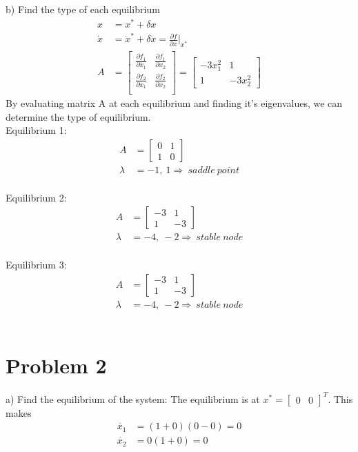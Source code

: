 \documentclass[paper=a4, fontsize=11pt]{scrartcl} %
\numberwithin{equation}{section} %
\numberwithin{figure}{section} %
\numberwithin{table}{section} %
\begin{document}
b) Find the type of each equilibrium
\begin{align*}
x &= x^* + \delta x \\
\dot{x} &= \dot{x}^* + \delta \dot{x} = \frac{\partial f}{\partial x}\Bigr|_{x^*} \\
A &= \begin{bmatrix}
\frac{\partial f_1}{\partial x_1} & \frac{\partial f_1}{\partial x_2} \\ 
\frac{\partial f_2}{\partial x_1} & \frac{\partial f_2}{\partial x_2} \\ 
\end{bmatrix}
= \begin{bmatrix}
-3x_1^2 & 1 \\ 
1 & -3x_2^2 
\end{bmatrix}
\end{align*}
By evaluating matrix A at each equilibrium and finding it's eigenvalues, we can determine the type of equilibrium.\\
Equilibrium 1: 
\begin{align}
A &= \begin{bmatrix}
0 & 1\\ 
1 & 0  
\end{bmatrix}\\
\lambda &= -1,\ 1 \Rightarrow\ saddle\ point
\end{align} \\
Equilibrium 2: 
\begin{align}
A &= \begin{bmatrix}
-3 & 1\\ 
1 & -3  
\end{bmatrix}\\
\lambda &= -4,\ -2 \Rightarrow\ stable\ node
\end{align} \\
Equilibrium 3: 
\begin{align}
A &= \begin{bmatrix}
-3 & 1\\ 
1 & -3  
\end{bmatrix}\\
\lambda &= -4,\ -2 \Rightarrow\ stable\ node
\end{align} \\

\newpage

\section{Problem 2}
a) Find the equilibrium of the system:
The equilibrium is at $x^* = \begin{bmatrix}0 & 0\end{bmatrix}^T$. This makes 
\begin{align*}
\dot{x_1} &=(1+0)(0-0) = 0\\
\dot{x_2} &= 0(1+0) = 0
\end{align*}
\end{document}
